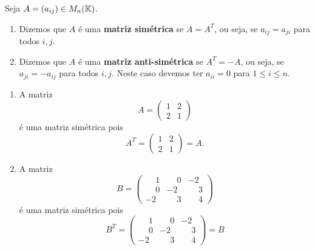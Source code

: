 \begin{definicao}
    Seja $A = (a_{ij})\in M_n(\mathbb{K})$.
    \begin{enumerate}
        \item Dizemos que $A$ é uma \textbf{matriz simétrica} se $A = A^T$, ou seja, se $a_{ij} = a_{ji}$ para todos $i, j$.
        \item Dizemos que $A$ é uma \textbf{matriz anti-simétrica} se $A^T = -A$, ou seja, se $a_{ji} =
            -a_{ij}$ para todos $i, j$. Neste caso devemos ter $a_{ii} = 0$ para $1 \le i \le n$.
    \end{enumerate}
\end{definicao}

\begin{exemplos}
    \begin{enumerate}
        \item A matriz
            \[
                A = \begin{pmatrix}
                    1 & 2\\
                    2 & 1
                \end{pmatrix}
            \]
            é uma matriz simétrica pois
            \[
                A^T = \begin{pmatrix}
                    1 & 2\\
                    2 & 1
                \end{pmatrix} = A.
            \]

        \item A matriz
            \[
                B = \begin{pmatrix}
                    \phantom{-}1 & \phantom{-}0 & -2\\
                    \phantom{-}0 & -2 & \phantom{-}3\\
                    -2 & \phantom{-}3 & \phantom{-}4
                \end{pmatrix}
            \]
            é uma matriz simétrica pois
            \[
                B^T = \begin{pmatrix}
                    \phantom{-}1 & \phantom{-}0 & -2\\
                    \phantom{-}0 & -2 & \phantom{-}3\\
                    -2 & \phantom{-}3 & \phantom{-}4
                \end{pmatrix} = B
            \]


\end{enumerate}
\end{exemplos}
